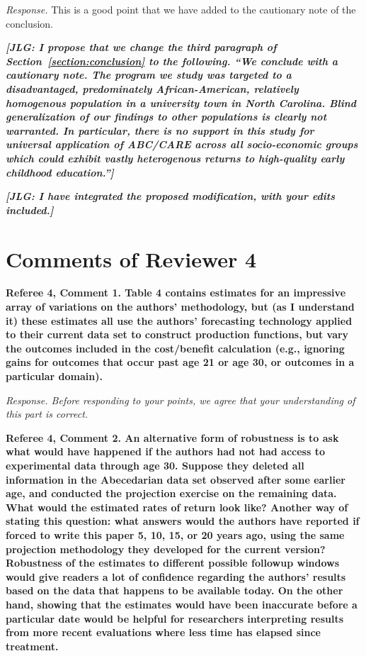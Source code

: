 \noindent \textit{Response.} This is a good point that we have added to the cautionary note of the conclusion.

\textit{\textbf{[JLG: I propose that we change the third paragraph of Section~\ref{section:conclusion} to the following. ``We conclude with a cautionary note. The program we study was targeted to a disadvantaged, predominately African-American, relatively homogenous population in a university town in North Carolina. Blind generalization of our findings to other populations is clearly not warranted. In particular, there is no support in this study for universal application of ABC/CARE across all socio-economic groups which could exhibit vastly heterogenous returns to high-quality early childhood education.'']}}

\textit{\textbf{[JLG: I have integrated the proposed modification, with your edits included.]}}

\section*{Comments of Reviewer 4}

\noindent \textbf{Referee 4, Comment 1. Table 4 contains estimates for an impressive array of variations on the authors' methodology, but (as I understand it) these estimates all use the authors' forecasting technology applied to their current data set to construct production functions, but vary the outcomes included in the cost/benefit calculation (e.g., ignoring gains for outcomes that occur past age 21 or age 30, or outcomes in a particular domain).}

\noindent \textit{Response. Before responding to your points, we agree that your understanding of this part is correct.}
 
\noindent \textbf{Referee 4, Comment 2. An alternative form of robustness is to ask what would have happened if the authors had not had access to experimental data through age 30. Suppose they deleted all information in the Abecedarian data set observed after some earlier age, and conducted the projection exercise on the remaining data. What would the estimated rates of return look like? Another way of stating this question: what answers would the authors have reported if forced to write this paper 5, 10, 15, or 20 years ago, using the same projection methodology they developed for the current version? Robustness of the estimates to different possible followup windows would give readers a lot of confidence regarding the authors' results based on the data that happens to be available today. On the other hand, showing that the estimates would have been inaccurate before a particular date would be helpful for researchers interpreting results from more recent evaluations where less time has elapsed since treatment.}

